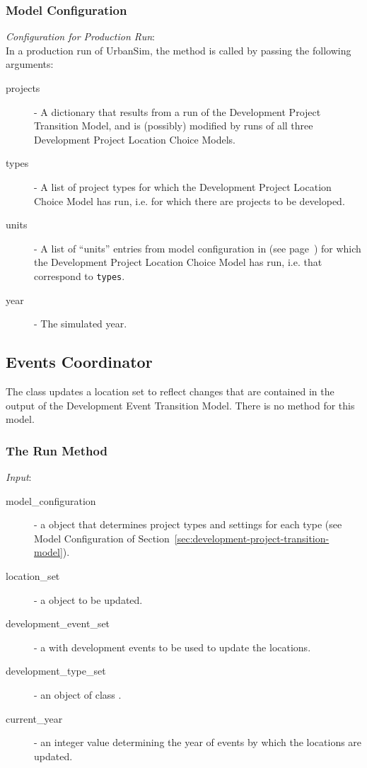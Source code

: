 \subsubsection{Model Configuration}
\modelsindex
%
{\em Configuration for Production Run}:\\[1mm]
In a production run of UrbanSim, the  method is called by
passing the following arguments:
\begin{description}
\item[projects] - A dictionary that results from a run of the Development
  Project Transition Model, and is (possibly) modified by runs of all three
  Development Project Location Choice Models. 
\item[types] - A list of project types for which the Development Project
  Location Choice Model has run, i.e. for which there are projects to be
  developed.
\item[units] - A list of ``units'' entries from model configuration in
   (see page~\pageref{page:model-configuration}) for which the
  Development Project Location Choice Model has run, i.e. that correspond to
  \verb|types|.
\item[year] - The simulated year.
\end{description}


%
\subsection{Events Coordinator}
\label{sec:events-coordinator}
%
The class  updates a location set to reflect changes
that are contained in the output of the Development Event Transition Model. 
There is no  method for this model. 
%
\subsubsection{The Run Method}
%
{\it Input}:
\begin{description}
\item[model_configuration] - a  object that determines
  project types and settings for each type (see Model Configuration of
  Section~\ref{sec:development-project-transition-model}).
\item[location_set] - a  object to be updated.
\item[development_event_set] - a  with development
  events to be used to update the locations.
\item[development_type_set] - an object of class .
\item[current_year] - an integer value determining the year of events by
  which the locations are updated.
\end{description}

